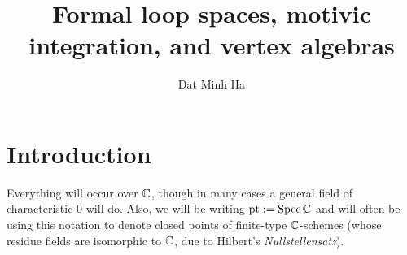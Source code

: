 

\setcounter{section}{-1}





    \title{Formal loop spaces, motivic integration, and vertex algebras}
    
    \author{Dat Minh Ha}
    \maketitle
    
    \begin{abstract}
        
    \end{abstract}
    
    {
      \hypersetup{} 
      \tableofcontents %
    }

    \section{Introduction}
        \begin{convention}
            Everything will occur over $\mathbb{C}$, though in many cases a general field of characteristic $0$ will do. Also, we will be writing $\mathrm{pt} := \operatorname{Spec} \mathbb{C}$ and will often be using this notation to denote closed points of finite-type $\mathbb{C}$-schemes (whose residue fields are isomorphic to $\mathbb{C}$, due to Hilbert's \textit{Nullstellensatz}).
        \end{convention}

    

    

    
	
    \printbibliography

